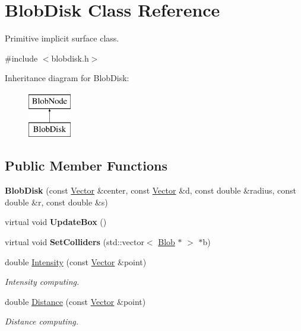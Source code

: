 \hypertarget{class_blob_disk}{
\section{BlobDisk Class Reference}
\label{class_blob_disk}
}


Primitive implicit surface class.  




{\ttfamily \#include $<$blobdisk.h$>$}

Inheritance diagram for BlobDisk:\begin{figure}[H]
\begin{center}
\leavevmode
\includegraphics[height=2.000000cm]{class_blob_disk}
\end{center}
\end{figure}
\subsection*{Public Member Functions}
\begin{DoxyCompactItemize}
\item 
\hypertarget{class_blob_disk_a6ada5d4eaf83133770093b79cf236fae}{
{\bfseries BlobDisk} (const \hyperlink{class_vector}{Vector} \&center, const \hyperlink{class_vector}{Vector} \&d, const double \&radius, const double \&r, const double \&s)}
\label{class_blob_disk_a6ada5d4eaf83133770093b79cf236fae}

\item 
\hypertarget{class_blob_disk_a3c5e4ebf872ec9260234672540cfca21}{
virtual void {\bfseries UpdateBox} ()}
\label{class_blob_disk_a3c5e4ebf872ec9260234672540cfca21}

\item 
\hypertarget{class_blob_disk_ac43415b67a5672b9ecf556613158c07c}{
virtual void {\bfseries SetColliders} (std::vector$<$ \hyperlink{class_blob}{Blob} $\ast$ $>$ $\ast$b)}
\label{class_blob_disk_ac43415b67a5672b9ecf556613158c07c}

\item 
double \hyperlink{class_blob_disk_ae057c9ec438f187c98355f7898458cea}{Intensity} (const \hyperlink{class_vector}{Vector} \&point)
\begin{DoxyCompactList}\small\item\em Intensity computing. \item\end{DoxyCompactList}\item 
double \hyperlink{class_blob_disk_aa999caad1dd27366971214f2b2d0e9aa}{Distance} (const \hyperlink{class_vector}{Vector} \&point)
\begin{DoxyCompactList}\small\item\em Distance computing. \item\end{DoxyCompactList}\end{DoxyCompactItemize}


